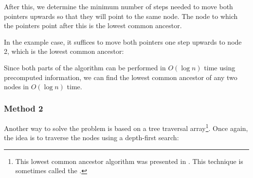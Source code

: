 After this, we determine the minimum number of steps
needed to move both pointers upwards so that
they will point to the same node.
The node to which the pointers point after this
is the lowest common ancestor.

In the example case, it suffices to move both pointers
one step upwards to node 2,
which is the lowest common ancestor:

\begin{center}
\end{center}

Since both parts of the algorithm can be performed in
$O(\log n)$ time using precomputed information,
we can find the lowest common ancestor of any two
nodes in $O(\log n)$ time.

\subsubsection{Method 2}

Another way to solve the problem is based on
a tree traversal array\footnote{This lowest common ancestor algorithm was presented in \cite{ben00}.
This technique is sometimes called the 
 \cite{tar84}.}.
Once again, the idea is to traverse the nodes
using a depth-first search:

